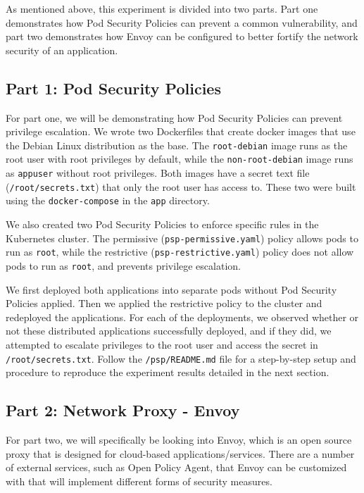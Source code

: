 As mentioned above, this experiment is divided into two parts. Part one demonstrates 
how Pod Security Policies can prevent a common vulnerability, and part two demonstrates 
how Envoy can be configured to better fortify the network security of an application.

\subsection{Part 1: Pod Security Policies}
For part one, we will be  demonstrating how Pod Security Policies can prevent privilege 
escalation. We wrote two Dockerfiles that create docker images that use the Debian Linux 
distribution as the base. The \verb|root-debian| image runs as the root user with root 
privileges by default, while the \verb|non-root-debian| image runs as \verb|appuser| 
without root privileges. Both images have a secret text file (\verb|/root/secrets.txt|) 
that only the root user has access to. These two were built using the \verb|docker-compose| 
in the \verb|app| directory. 

We also created two Pod Security Policies to enforce specific rules in the Kubernetes cluster. 
The permissive (\verb|psp-permissive.yaml|) policy allows pods to run as \verb|root|, while 
the restrictive (\verb|psp-restrictive.yaml|) policy does not allow pods to run as \verb|root|, 
and prevents privilege escalation. 

We first deployed both applications into separate pods without Pod Security Policies applied. 
Then we applied the restrictive policy to the cluster and redeployed the applications. 
For each of the deployments, we observed whether or not these distributed applications successfully 
deployed, and if they did, we attempted to escalate privileges to the root user and access the 
secret in \verb|/root/secrets.txt|. Follow the \verb|/psp/README.md| file for a step-by-step 
setup and procedure to reproduce the experiment results detailed in the next section.

\subsection{Part 2: Network Proxy - Envoy}
For part two, we will specifically be looking into Envoy, which is an open source proxy that is 
designed for cloud-based applications/services. There are a number of external services, such as 
Open Policy Agent, that Envoy can be customized with that will implement different forms of 
security measures. 

